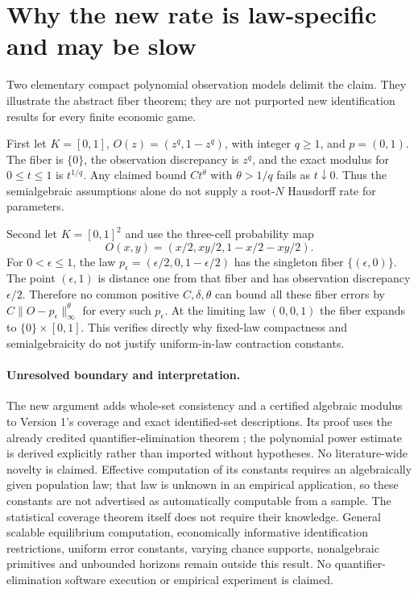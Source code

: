 \documentclass[11pt]{article}
\theoremstyle{remark}\newtheorem{remark}[theorem]{Remark}
\begin{document}
\section*{Why the new rate is law-specific and may be slow}
Two elementary compact polynomial observation models delimit the claim.
They illustrate the abstract fiber theorem; they are not purported new
identification results for every finite economic game.

First let $K=[0,1]$, $O(z)=(z^q,1-z^q)$, with integer $q\geq1$, and
$p=(0,1)$. The fiber is $\{0\}$, the observation discrepancy is $z^q$,
and the exact modulus for $0\leq t\leq1$ is $t^{1/q}$. Any claimed bound
$C t^\theta$ with $\theta>1/q$ fails as $t\downarrow0$. Thus the
semialgebraic assumptions alone do not supply a root-$N$ Hausdorff rate
for parameters.

Second let $K=[0,1]^2$ and use the three-cell probability map
\[
 O(x,y)=(x/2,xy/2,1-x/2-xy/2).
\]
For $0<\epsilon\leq1$, the law
$p_\epsilon=(\epsilon/2,0,1-\epsilon/2)$ has the singleton fiber
$\{(\epsilon,0)\}$. The point $(\epsilon,1)$ is distance one from that
fiber and has observation discrepancy $\epsilon/2$. Therefore no common
positive $C,\delta,\theta$ can bound all these fiber errors by
$C\|O-p_\epsilon\|_\infty^\theta$ for every such $p_\epsilon$.
At the limiting law $(0,0,1)$ the fiber expands to $\{0\}\times[0,1]$.
This verifies directly why fixed-law compactness and semialgebraicity do
not justify uniform-in-law contraction constants.

\paragraph{Unresolved boundary and interpretation.}
The new argument adds whole-set consistency and a certified algebraic
modulus to Version 1's coverage and exact identified-set descriptions.
Its proof uses the already credited quantifier-elimination theorem
\cite{BPR}; the polynomial power estimate is derived explicitly rather
than imported without hypotheses. No literature-wide novelty is claimed.
Effective computation of its constants requires an algebraically given
population law; that law is unknown in an empirical application, so these
constants are not advertised as automatically computable from a sample.
The statistical coverage theorem itself does not require their knowledge.
General scalable equilibrium computation, economically informative
identification restrictions, uniform error constants, varying chance
supports, nonalgebraic primitives and unbounded horizons remain outside
this result. No quantifier-elimination software execution or empirical
experiment is claimed.
\end{document}

